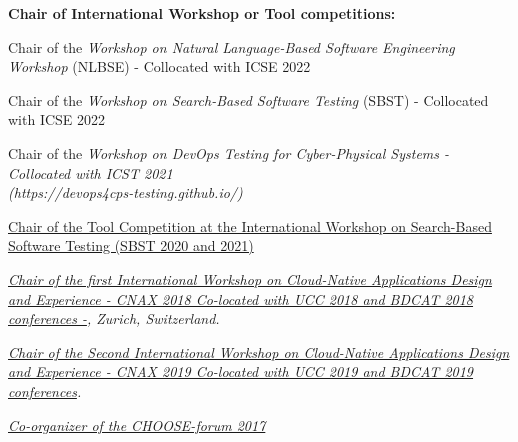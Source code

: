 \documentclass[10pt]{article}
\begin{document}


\textbf{Chair of International Workshop or Tool competitions:}
\begin{innerlist}
\item Chair of the \textit{Workshop on Natural Language-Based Software Engineering Workshop} (NLBSE) - Collocated with ICSE 2022
\item Chair of  the \textit{Workshop on Search-Based Software Testing} (SBST) - Collocated with ICSE 2022
\item Chair of the \textit{Workshop on DevOps Testing for Cyber-Physical Systems - Collocated with ICST 2021 \\(https://devops4cps-testing.github.io/)} 
\item \href{}
{Chair of the Tool Competition at the 
International Workshop on Search-Based Software Testing (SBST 2020 and 2021)} 
       \item \emph{\href{http://cnax.servicelaboratory.ch/}
                   {\textit{Chair of the first International Workshop on Cloud-Native Applications Design and Experience - CNAX 2018
Co-located with UCC 2018 and BDCAT 2018 conferences -}}, Zurich, Switzerland.}

       \item \emph{\href{}
                   {\textit{Chair of the Second International Workshop on Cloud-Native Applications Design and Experience - CNAX 2019
Co-located with UCC 2019 and BDCAT 2019 conferences}}.}
\item \textit{\href{http://www.choose.s-i.ch/events/forum2017/index.html}{Co-organizer of the CHOOSE-forum 2017}} 
\end{innerlist}
\end{document}
